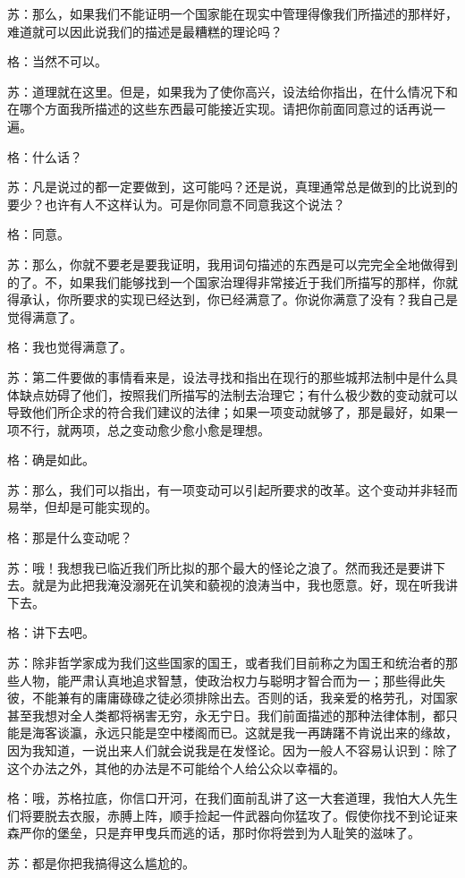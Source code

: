 \documentclass[12pt,oneside]{book}
\begin{document}
苏：那么，如果我们不能证明一个国家能在现实中管理得像我们所描述的那样好，难道就可以因此说我们的描述是最糟糕的理论吗？

格：当然不可以。

苏：道理就在这里。但是，如果我为了使你高兴，设法给你指出，在什么情况下和在哪个方面我所描述的这些东西最可能接近实现。请把你前面同意过的话再说一遍。

格：什么话？

苏：凡是说过的都一定要做到，这可能吗？还是说，真理通常总是做到的比说到的要少？也许有人不这样认为。可是你同意不同意我这个说法？

格：同意。

苏：那么，你就不要老是要我证明，我用词句描述的东西是可以完完全全地做得到的了。不，如果我们能够找到一个国家治理得非常接近于我们所描写的那样，你就得承认，你所要求的实现已经达到，你已经满意了。你说你满意了没有？我自己是觉得满意了。

格：我也觉得满意了。

苏：第二件要做的事情看来是，设法寻找和指出在现行的那些城邦法制中是什么具体缺点妨碍了他们，按照我们所描写的法制去治理它；有什么极少数的变动就可以导致他们所企求的符合我们建议的法律；如果一项变动就够了，那是最好，如果一项不行，就两项，总之变动愈少愈小愈是理想。

格：确是如此。

苏：那么，我们可以指出，有一项变动可以引起所要求的改革。这个变动并非轻而易举，但却是可能实现的。

格：那是什么变动呢？

苏：哦！我想我已临近我们所比拟的那个最大的怪论之浪了。然而我还是要讲下去。就是为此把我淹没溺死在讥笑和藐视的浪涛当中，我也愿意。好，现在听我讲下去。

格：讲下去吧。

苏：除非哲学家成为我们这些国家的国王，或者我们目前称之为国王和统治者的那些人物，能严肃认真地追求智慧，使政治权力与聪明才智合而为一；那些得此失彼，不能兼有的庸庸碌碌之徒必须排除出去。否则的话，我亲爱的格劳孔，对国家甚至我想对全人类都将祸害无穷，永无宁日。我们前面描述的那种法律体制，都只能是海客谈瀛，永远只能是空中楼阁而已。这就是我一再踌躇不肯说出来的缘故，因为我知道，一说出来人们就会说我是在发怪论。因为一般人不容易认识到：除了这个办法之外，其他的办法是不可能给个人给公众以幸福的。

格：哦，苏格拉底，你信口开河，在我们面前乱讲了这一大套道理，我怕大人先生们将要脱去衣服，赤膊上阵，顺手捡起一件武器向你猛攻了。假使你找不到论证来森严你的堡垒，只是弃甲曳兵而逃的话，那时你将尝到为人耻笑的滋味了。

苏：都是你把我搞得这么尴尬的。
\end{document}

